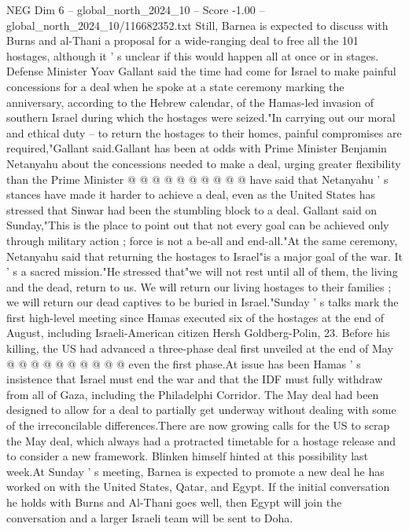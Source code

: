 \begin{textsample}{NEG Dim 6 – global\_north\_2024\_10 – Score -1.00 – global\_north\_2024\_10/116682352.txt}
Still, Barnea is expected to discuss with Burns and al-Thani a proposal for a wide-ranging deal to free all the 101 hostages, although it ' s unclear if this would happen all at once or in stages.
Defense Minister Yoav Gallant said the time had come for Israel to make painful concessions for a deal when he spoke at a state ceremony marking the anniversary, according to the Hebrew calendar, of the Hamas-led invasion of southern Israel during which the hostages were seized."In carrying out our moral and ethical duty -- to return the hostages to their homes, painful compromises are required,"Gallant said.Gallant has been at odds with Prime Minister Benjamin Netanyahu about the concessions needed to make a deal, urging greater flexibility than the Prime Minister @ @ @ @ @ @ @ @ @ @ have said that Netanyahu ' s stances have made it harder to achieve a deal, even as the United States has stressed that Sinwar had been the stumbling block to a deal.
Gallant said on Sunday,"This is the place to point out that not every goal can be achieved only through military action ; force is not a be-all and end-all."At the same ceremony, Netanyahu said that returning the hostages to Israel"is a major goal of the war.
It ' s a sacred mission."He stressed that"we will not rest until all of them, the living and the dead, return to us.
We will return our living hostages to their families ; we will return our dead captives to be buried in Israel."Sunday ' s talks mark the first high-level meeting since Hamas executed six of the hostages at the end of August, including Israeli-American citizen Hersh Goldberg-Polin, 23.
Before his killing, the US had advanced a three-phase deal first unveiled at the end of May @ @ @ @ @ @ @ @ @ @ even the first phase.At issue has been Hamas ' s insistence that Israel must end the war and that the IDF must fully withdraw from all of Gaza, including the Philadelphi Corridor.
The May deal had been designed to allow for a deal to partially get underway without dealing with some of the irreconcilable differences.There are now growing calls for the US to scrap the May deal, which always had a protracted timetable for a hostage release and to consider a new framework.
Blinken himself hinted at this possibility last week.At Sunday ' s meeting, Barnea is expected to promote a new deal he has worked on with the United States, Qatar, and Egypt.
If the initial conversation he holds with Burns and Al-Thani goes well, then Egypt will join the conversation and a larger Israeli team will be sent to Doha.

\end{textsample}
